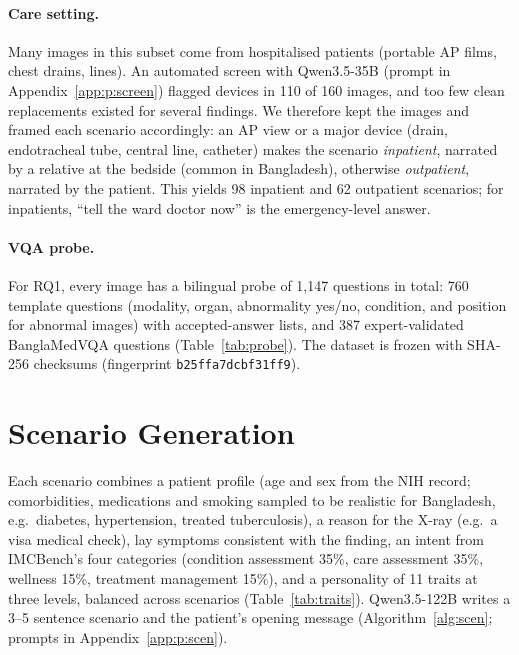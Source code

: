 \documentclass[11pt]{article}
\begin{document}
\paragraph{Care setting.} Many images in this subset come from hospitalised patients (portable AP films, chest drains, lines). An automated screen with Qwen3.5-35B (prompt in Appendix~\ref{app:p:screen}) flagged devices in 110 of 160 images, and too few clean replacements existed for several findings. We therefore kept the images and framed each scenario accordingly: an AP view or a major device (drain, endotracheal tube, central line, catheter) makes the scenario \emph{inpatient}, narrated by a relative at the bedside (common in Bangladesh), otherwise \emph{outpatient}, narrated by the patient. This yields 98 inpatient and 62 outpatient scenarios; for inpatients, ``tell the ward doctor now'' is the emergency-level answer.

\paragraph{VQA probe.} For RQ1, every image has a bilingual probe of 1,147 questions in total: 760 template questions (modality, organ, abnormality yes/no, condition, and position for abnormal images) with accepted-answer lists, and 387 expert-validated BanglaMedVQA questions (Table~\ref{tab:probe}). The dataset is frozen with SHA-256 checksums (fingerprint \texttt{b25ffa7dcbf31ff9}).



\section{Scenario Generation}\label{sec:scen}
Each scenario combines a patient profile (age and sex from the NIH record; comorbidities, medications and smoking sampled to be realistic for Bangladesh, e.g.\ diabetes, hypertension, treated tuberculosis), a reason for the X-ray (e.g.\ a visa medical check), lay symptoms consistent with the finding, an intent from IMCBench's four categories (condition assessment 35\%, care assessment 35\%, wellness 15\%, treatment management 15\%), and a personality of 11 traits at three levels, balanced across scenarios (Table~\ref{tab:traits}). Qwen3.5-122B writes a 3--5 sentence scenario and the patient's opening message (Algorithm~\ref{alg:scen}; prompts in Appendix~\ref{app:p:scen}).
\end{document}
